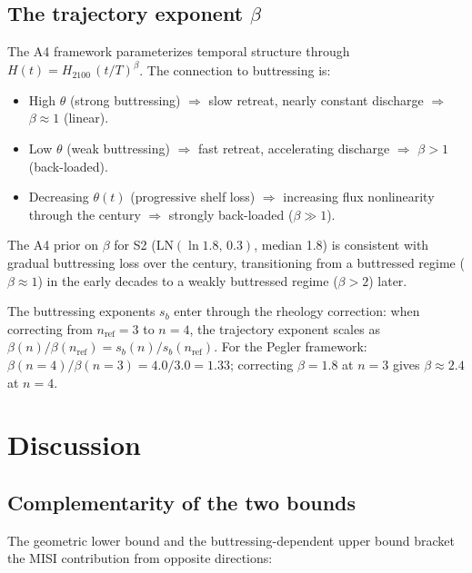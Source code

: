 \documentclass[11pt]{article}
\begin{document}
\subsection{The trajectory exponent $\beta$}

The A4 framework parameterizes temporal structure through $H(t) = H_{2100}\,(t/T)^\beta$. The connection to buttressing is:

\begin{itemize}
	\item High $\theta$ (strong buttressing) $\Rightarrow$ slow retreat, nearly constant discharge $\Rightarrow$ $\beta \approx 1$ (linear).
	\item Low $\theta$ (weak buttressing) $\Rightarrow$ fast retreat, accelerating discharge $\Rightarrow$ $\beta > 1$ (back-loaded).
	\item Decreasing $\theta(t)$ (progressive shelf loss) $\Rightarrow$ increasing flux nonlinearity through the century $\Rightarrow$ strongly back-loaded ($\beta \gg 1$).
\end{itemize}

The A4 prior on $\beta$ for S2 ($\mathrm{LN}(\ln 1.8,\, 0.3)$, median 1.8) is consistent with gradual buttressing loss over the century, transitioning from a buttressed regime ($\beta \approx 1$) in the early decades to a weakly buttressed regime ($\beta > 2$) later.

The buttressing exponents $s_b$ enter through the rheology correction: when correcting from $n_{\mathrm{ref}} = 3$ to $n = 4$, the trajectory exponent scales as $\beta(n)/\beta(n_{\mathrm{ref}}) = s_b(n)/s_b(n_{\mathrm{ref}})$. For the Pegler framework: $\beta(n=4)/\beta(n=3) = 4.0/3.0 = 1.33$; correcting $\beta = 1.8$ at $n=3$ gives $\beta \approx 2.4$ at $n = 4$.


\section{Discussion}
\label{sec:discussion}

\subsection{Complementarity of the two bounds}

The geometric lower bound and the buttressing-dependent upper bound bracket the MISI contribution from opposite directions:
\end{document}

